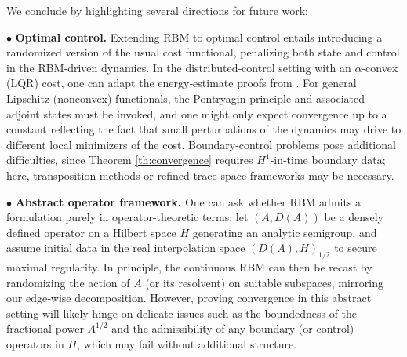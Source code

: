 \documentclass[10pt,a4paper]{amsart}
\begin{document}
We conclude by highlighting several directions for future work:
\smallbreak

\noindent
$\bullet$  \textbf{Optimal control.} Extending RBM to optimal control entails introducing a randomized version of the usual cost functional, penalizing both state and control in the RBM‐driven dynamics. In the distributed‐control setting with an $\alpha$‐convex (LQR) cost, one can adapt the energy‐estimate proofs from \cite{MR4433122}. For general Lipschitz (nonconvex) functionals, the Pontryagin principle and associated adjoint states must be invoked, and one might only expect convergence up to a constant reflecting the fact that small perturbations of the dynamics may drive to different local minimizers of the cost. Boundary‐control problems pose additional difficulties, since Theorem \ref{th:convergence} requires $H^1$‐in‐time boundary data; here, transposition methods or refined trace‐space frameworks may be necessary.




\noindent
$\bullet$ \textbf{Abstract operator framework.} One can ask whether RBM admits a formulation purely in operator‐theoretic terms: let $(A,D(A))$ be a densely defined operator on a Hilbert space $H$ generating an analytic semigroup, and assume initial data in the real interpolation space $(D(A),H)_{1/2}$ to secure maximal regularity.  In principle, the continuous RBM can then be recast by randomizing the action of $A$ (or its resolvent) on suitable subspaces, mirroring our edge‐wise decomposition.  However, proving convergence in this abstract setting will likely hinge on delicate issues such as the boundedness of the fractional power $A^{1/2}$ and the admissibility of any boundary (or control) operators in $H$, which may fail without additional structure.
\end{document}
